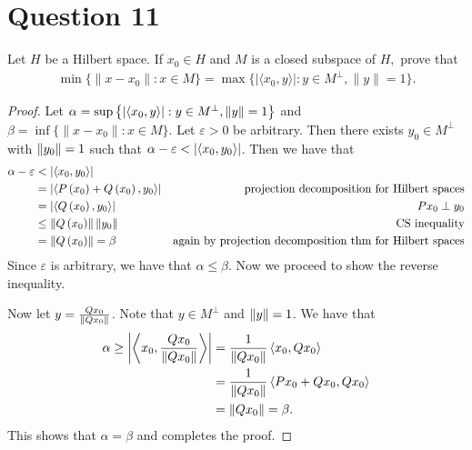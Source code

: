 \section{Question 11}

\horz
Let $H$ be a Hilbert space. If $x_0\in H$ and $M$ is a closed subspace of $H,$ prove that
\begin{align*}
\min \{\|x-x_0\| : x\in M\} = \max \{ |\langle x_0,y\rangle | : y\in M^{\perp},\|y\|=1\}.
\end{align*}
\horz
\begin{proof}
    Let $\alpha = \sup\left\{ \left\lvert \left\langle x_{0},y \right\rangle \right\rvert : y \in M^{\perp}, \left\lVert y \right\rVert=1 \right\}$ and $\beta = \inf \{\|x-x_0\| : x\in M\} $. Let $\varepsilon > 0$ be arbitrary. Then there exists $y_{0} \in M^{\perp}$ with $\left\lVert y_{0} \right\rVert=1$ such that $\alpha - \varepsilon < \left\lvert \left\langle x_{0}, y_{0} \right\rangle \right\rvert$. Then we have that
    \begin{align*}
	\alpha - \varepsilon &< \left\lvert \left\langle x_{0}, y_{0} \right\rangle \right\rvert \\
	&= \left\lvert \left\langle P\left( x_{0} \right) + Q \left( x_{0} \right), y_{0} \right\rangle \right\rvert & \text{projection decomposition for Hilbert spaces} \\
	&= \left\lvert \left\langle Q \left( x_{0} \right), y_{0} \right\rangle \right\rvert & Px_{0} \perp y_{0} \\
	&\le \left\lVert Q \left( x_{0} \right) \right\rVert \left\lVert y_{0} \right\rVert & \text{CS inequality} \\
	&= \left\lVert Q \left( x_{0} \right) \right\rVert =\beta & \text{again by projection decomposition thm for Hilbert spaces}
    \end{align*}
    Since $\varepsilon$ is arbitrary, we have that $\alpha \le \beta$. Now we proceed to show the reverse inequality.

    Now let $y=\frac{Qx_{0}}{\left\lVert Qx_{0} \right\rVert}$. Note that $y\in M^{\perp}$ and $\left\lVert y \right\rVert =1$. We have that
    \begin{align*}
	\alpha \ge \left\lvert \left\langle x_{0}, \frac{Qx_{0}}{\left\lVert Qx_{0} \right\rVert} \right\rangle \right\rvert &= \frac{1}{\left\lVert Qx_{0} \right\rVert} \left\langle x_{0}, Qx_{0} \right\rangle \\
	&= \frac{1}{\left\lVert Qx_{0} \right\rVert} \left\langle Px_{0} + Qx_{0} , Qx_{0} \right\rangle \\
	&= \left\lVert Qx_{0} \right\rVert = \beta \text{.}
    \end{align*}
    This shows that $\alpha = \beta$ and completes the proof.
\end{proof}
